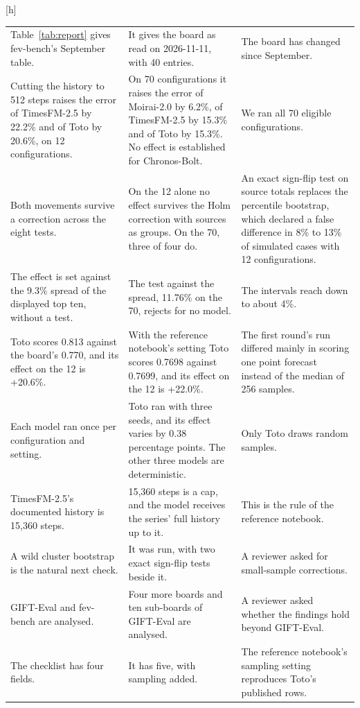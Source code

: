 \documentclass{article}
\makeatletter
\renewenvironment{table}
  {\setlength{\abovecaptionskip}{6\p@}%
   \setlength{\belowcaptionskip}{\z@}%
   \@float{table}}
  {\end@float}
\makeatother
\begin{document}
\begin{table}[h]
\begin{tabular}{@{}p{4.1cm}p{4.9cm}p{4.3cm}@{}}
\addlinespace[2pt]
Table~\ref{tab:report} gives fev-bench's September table. &
It gives the board as read on 2026-11-11, with 40 entries. &
The board has changed since September. \\
\addlinespace[2pt]
Cutting the history to 512 steps raises the error of TimesFM-2.5 by 22.2\% and of Toto by
20.6\%, on 12 configurations. &
On 70 configurations it raises the error of Moirai-2.0 by 6.2\%, of TimesFM-2.5 by 15.3\% and
of Toto by 15.3\%. No effect is established for Chronos-Bolt. &
We ran all 70 eligible configurations. \\
\addlinespace[2pt]
Both movements survive a correction across the eight tests. &
On the 12 alone no effect survives the Holm correction with sources as groups. On the 70, three
of four do. &
An exact sign-flip test on source totals replaces the percentile bootstrap, which declared a
false difference in 8\% to 13\% of simulated cases with 12 configurations. \\
\addlinespace[2pt]
The effect is set against the 9.3\% spread of the displayed top ten, without a test. &
The test against the spread, 11.76\% on the 70, rejects for no model. &
The intervals reach down to about 4\%. \\
\addlinespace[2pt]
Toto scores 0.813 against the board's 0.770, and its effect on the 12 is +20.6\%. &
With the reference notebook's setting Toto scores 0.7698 against 0.7699, and its effect on the
12 is +22.0\%. &
The first round's run differed mainly in scoring one point forecast instead of the median of
256 samples. \\
\addlinespace[2pt]
Each model ran once per configuration and setting. &
Toto ran with three seeds, and its effect varies by 0.38 percentage points. The other three
models are deterministic. &
Only Toto draws random samples. \\
\addlinespace[2pt]
TimesFM-2.5's documented history is 15,360 steps. &
15,360 steps is a cap, and the model receives the series' full history up to it. &
This is the rule of the reference notebook. \\
\addlinespace[2pt]
A wild cluster bootstrap is the natural next check. &
It was run, with two exact sign-flip tests beside it. &
A reviewer asked for small-sample corrections. \\
\addlinespace[2pt]
GIFT-Eval and fev-bench are analysed. &
Four more boards and ten sub-boards of GIFT-Eval are analysed. &
A reviewer asked whether the findings hold beyond GIFT-Eval. \\
\addlinespace[2pt]
The checklist has four fields. &
It has five, with sampling added. &
The reference notebook's sampling setting reproduces Toto's published rows. \\
\bottomrule
\end{tabular}
\caption{What changed between the submitted version and this one. The reversal count on
GIFT-Eval, the census and the counts of received history are unchanged.}
\label{tab:changes}
\end{table}
\clearpage
\end{document}
